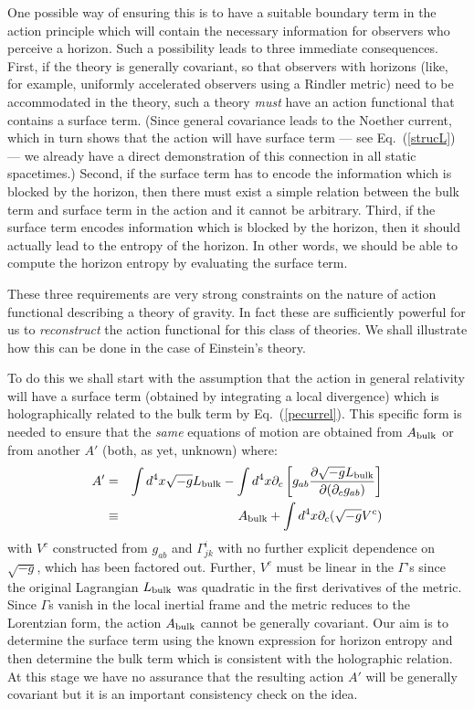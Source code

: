 \documentclass[12pt]{iopart}
\def\eq#1{{Eq.~(\ref{#1})}}
\begin{document}
One possible way of ensuring this is to have a suitable boundary term in the action principle which will contain  the necessary information for observers who perceive a horizon. Such a possibility leads to three immediate consequences. 
  First, if the theory is generally covariant, so that observers with horizons (like, for example, uniformly accelerated observers using a Rindler metric) need to be 
 accommodated in the theory, such a theory \textit{must} have an action functional that contains
  a surface term.
  (Since general covariance leads to the Noether current, which in turn shows that the action will have surface term --- see \eq{strucL} --- we already have a direct demonstration of this connection in all static spacetimes.)
  Second, if the surface term has to  encode the information which is blocked by the horizon,
   then there must exist a simple relation between the bulk term
   and surface term in the action and it cannot be  arbitrary.
   Third, 
   if the surface term encodes information which is blocked by the horizon, then
   it should actually lead to the entropy of the horizon. In other words, we should be able
   to compute the horizon entropy by evaluating the surface term.
  
  These three requirements are very strong constraints on the nature of action functional describing  a theory of gravity. 
  In fact these are sufficiently powerful for us to \textit{reconstruct} the action functional for this class of theories. We shall illustrate \cite{TPapspsci03,TPbrazil05} how this can be done in  the case of Einstein's theory.
  
To do this we shall start with the assumption that  the action in general relativity will have a surface term (obtained by integrating a local divergence) which is  holographically related 
 to the bulk term by \eq{pecurrel}. This specific form is needed to ensure that the
 {\it same}  equations
    of motion  are obtained from $A_{\rm bulk}$ or from another $A'$ (both, as yet, unknown) where:
    \begin{eqnarray}
    \label{aeh}
   A' &=& \int d^4x \sqrt{-g} L_{\rm bulk} - \int d^4x \partial_c \left[ g_{ab}
    \frac{\partial \sqrt{-g} L_{\rm bulk} }{ \partial(\partial_c g_{ab})}
    \right]   \nonumber\\
   &\equiv&  A_{\rm bulk} + \int d^4 x \partial_c (\sqrt{-g}V^c) 
    \end{eqnarray}   
    with $V^c $ constructed from  $g_{ab} $ and $\Gamma^i_{jk}$ with no further explicit dependence on $\sqrt{-g}$, which has been factored out. Further, $V^c$ must be linear
    in the $\Gamma$'s since the original Lagrangian $L_{\rm bulk}$ was quadratic in the first derivatives
    of the metric. 
    Since $\Gamma$s vanish in the local inertial frame and the metric reduces to
    the Lorentzian form, the action $A_{\rm bulk}$ cannot be generally covariant. Our aim is to determine the surface term using the known expression for horizon entropy and then determine the bulk term which is consistent with the holographic relation. At this stage we have no assurance that the resulting action $A'$ will be generally covariant but it is an important consistency check on the idea.
   
\end{document}
